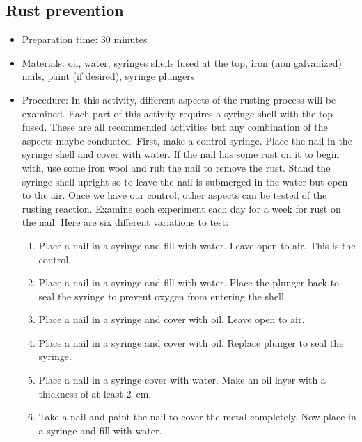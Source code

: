 \subsection{Rust prevention}
\begin{itemize}
\item{Preparation time: 30 minutes}
\item{Materials: oil, water, syringes shells fused at the top, iron (non galvanized) nails, paint (if desired), syringe plungers}
\item{Procedure: In this activity, different aspects of the rusting process will be examined. Each part of this activity requires a syringe shell with the top fused. These are all recommended activities but any combination of the aspects maybe conducted. First, make a control syringe. Place the nail in the syringe shell and cover with water. If the nail has some rust on it to begin with, use some iron wool and rub the nail to remove the rust. Stand the syringe shell upright so to leave the nail is submerged in the water but open to the air. Once we have our control, other aspects can be tested of the rusting reaction. Examine each experiment each day for a week for rust on the nail. Here are six different variations to test:}

\begin{enumerate}
\item{Place a nail in a syringe and fill with water. Leave open to air. This is the control.}
\item{Place a nail in a syringe and fill with water. Place the plunger back to seal the syringe to prevent oxygen from entering the shell.}
\item{Place a nail in a syringe and cover with oil. Leave open to air.}
\item{Place a nail in a syringe and cover with oil. Replace plunger to seal the syringe.}
\item{Place a nail in a syringe cover with water. Make an oil layer with a thickness of at least 2~cm.}
\item{Take a nail and paint the nail to cover the metal completely. Now place in a syringe and fill with water.}
\end{enumerate}


\end{itemize}
